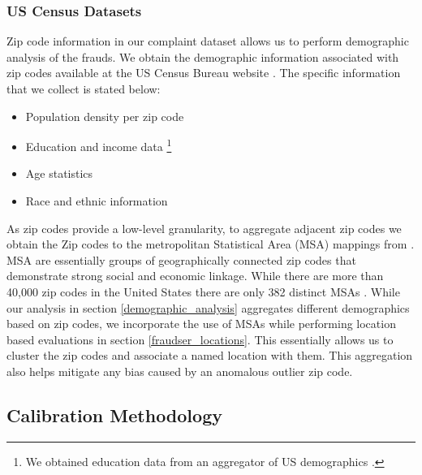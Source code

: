 \documentclass[conference]{IEEEtran}
\begin{document}
\subsubsection{US Census Datasets}
Zip code information in our complaint dataset allows us to perform demographic analysis of the frauds. We obtain the demographic information associated with zip codes available at the US Census Bureau website \cite{uscensus}. The specific information that we collect is stated below:

\begin{itemize}
\vspace{8pt}
  \item Population density per zip code
  \item Education and income data \footnote{We obtained education data from an aggregator of US demographics \cite{zipatlas}.}
  \item Age statistics
  \item Race and ethnic information
  \vspace{8pt}
\end{itemize}

As zip codes provide a low-level granularity, to aggregate adjacent zip codes we obtain the Zip codes to the metropolitan Statistical Area (MSA) mappings from \cite{uslaborstats}. MSA are essentially groups of geographically connected zip codes that demonstrate strong social and economic linkage. While there are more than 40,000 zip codes in the United States there are only 382 distinct MSAs \cite{uscensus}. While our analysis in section \ref{demographic_analysis} aggregates different demographics based on zip codes, we incorporate the use of MSAs while performing location based evaluations in section \ref{fraudser_locations}. This essentially allows us to cluster the zip codes and associate a named location with them. This aggregation also helps mitigate any bias caused by an anomalous outlier zip code.

\subsection{Calibration Methodology}
\end{document}
